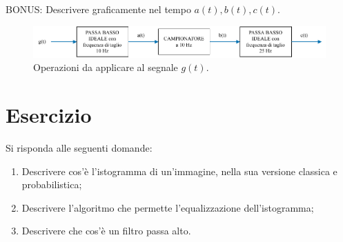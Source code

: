 \documentclass[a4paper]{article}
\begin{document}
	\noindent
	BONUS: Descrivere graficamente nel tempo $a\left(t\right), b\left(t\right), c\left(t\right)$.
	
	\begin{figure}[!htp]
		\centering
		\includegraphics[width=\textwidth]{img/fig_2.pdf}
		\caption{Operazioni da applicare al segnale $g\left(t\right)$.}
	\end{figure}

	\section{Esercizio}
	
	Si risponda alle seguenti domande:
	\begin{enumerate}
		\item Descrivere cos'è l'istogramma di un’immagine, nella sua versione classica e probabilistica;
		
		\item Descrivere l'algoritmo che permette l'equalizzazione dell'istogramma;
		
		\item Descrivere che cos'è un filtro passa alto.
	\end{enumerate}
\end{document}
